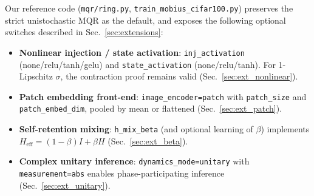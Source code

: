 \documentclass[11pt,a4paper]{article}
\begin{document}
Our reference code (\texttt{mqr/ring.py}, \texttt{train\_mobius\_cifar100.py}) preserves the strict unistochastic MQR as the default, and exposes the following optional switches described in Sec.~\ref{sec:extensions}:
\begin{itemize}
    \item \textbf{Nonlinear injection / state activation}: \texttt{inj\_activation} (none/relu/tanh/gelu) and \texttt{state\_activation} (none/relu/tanh). For 1-Lipschitz $\sigma$, the contraction proof remains valid (Sec.~\ref{sec:ext_nonlinear}).
    \item \textbf{Patch embedding front-end}: \texttt{image\_encoder=patch} with \texttt{patch\_size} and \texttt{patch\_embed\_dim}, pooled by mean or flattened (Sec.~\ref{sec:ext_patch}).
    \item \textbf{Self-retention mixing}: \texttt{h\_mix\_beta} (and optional learning of $\beta$) implements $H_{\text{eff}}=(1-\beta)I+\beta H$ (Sec.~\ref{sec:ext_beta}).
    \item \textbf{Complex unitary inference}: \texttt{dynamics\_mode=unitary} with \texttt{measurement=abs} enables phase-participating inference (Sec.~\ref{sec:ext_unitary}).
\end{itemize}
\end{document}
